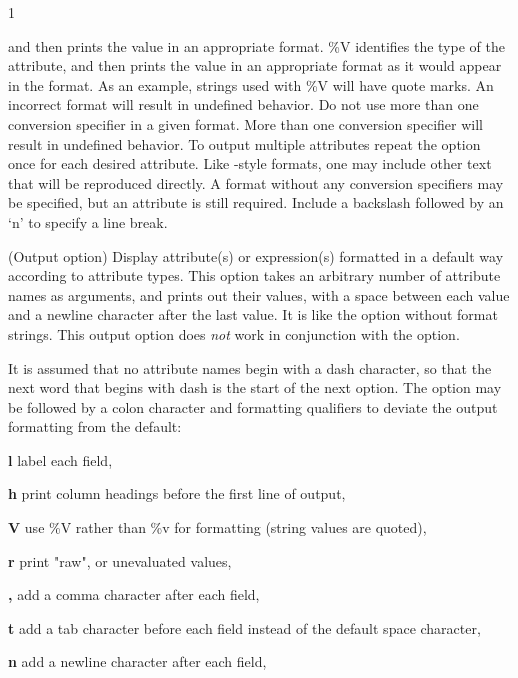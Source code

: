 \begin{ManPage}{\label{man-condor-status}}{1}
\begin{Options}
{      and then prints the value in an appropriate format.
      \%V identifies the type of the attribute, 
      and then prints the value in an appropriate format as it would
      appear in the  format.
      As an example, strings used with \%V will have quote marks.
      An incorrect format will result in undefined behavior.
      Do not use more than one conversion specifier in a given
      format.  More than one conversion specifier will result
      in undefined behavior.  To output multiple attributes
      repeat the  option once for each desired
      attribute.
      Like -style formats, one may include other
      text that will be reproduced directly.
      A format without any conversion specifiers may be specified,
      but an attribute is still required.
      Include a backslash followed by an `n' to specify a line break. }


   {
    (Output option) Display attribute(s) or expression(s)
    formatted in a default way according to attribute types.  
    This option takes an arbitrary number of attribute names as arguments,
    and prints out their values, 
    with a space between each value and a newline character after 
    the last value.  
    It is like the  option without format strings.
    This output option does \emph{not} work in conjunction with the
     option.

    It is assumed that no attribute names begin with a dash character,
    so that the next word that begins with dash is the 
    start of the next option.
    The  option may be followed by a colon character
    and formatting qualifiers to deviate the output formatting from
    the default:

    \textbf{l} label each field,

    \textbf{h} print column headings before the first line of output,

    \textbf{V} use \%V rather than \%v for formatting (string values
    are quoted),

    \textbf{r} print "raw", or unevaluated values,

    \textbf{,} add a comma character after each field,

    \textbf{t} add a tab character before each field instead of 
    the default space character,

    \textbf{n} add a newline character after each field,

}
\end{Options}
\end{ManPage}
